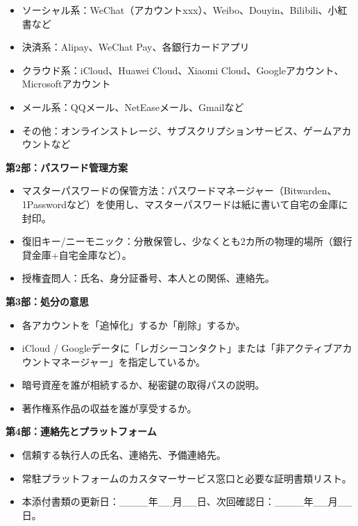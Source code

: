 \begin{itemize}
  \item ソーシャル系：WeChat（アカウントxxx）、Weibo、Douyin、Bilibili、小紅書など
  \item 決済系：Alipay、WeChat Pay、各銀行カードアプリ
  \item クラウド系：iCloud、Huawei Cloud、Xiaomi Cloud、Googleアカウント、Microsoftアカウント
  \item メール系：QQメール、NetEaseメール、Gmailなど
  \item その他：オンラインストレージ、サブスクリプションサービス、ゲームアカウントなど
\end{itemize}

\textbf{第2部：パスワード管理方案}

\begin{itemize}
  \item マスターパスワードの保管方法：パスワードマネージャー（Bitwarden、1Passwordなど）を使用し、マスターパスワードは紙に書いて自宅の金庫に封印。
  \item 復旧キー/ニーモニック：分散保管し、少なくとも2カ所の物理的場所（銀行貸金庫+自宅金庫など）。
  \item 授権査問人：氏名、身分証番号、本人との関係、連絡先。
\end{itemize}

\textbf{第3部：処分の意思}

\begin{itemize}
  \item 各アカウントを「追悼化」するか「削除」するか。
  \item iCloud / Googleデータに「レガシーコンタクト」または「非アクティブアカウントマネージャー」を指定しているか。
  \item 暗号資産を誰が相続するか、秘密鍵の取得パスの説明。
  \item 著作権系作品の収益を誰が享受するか。
\end{itemize}

\textbf{第4部：連絡先とプラットフォーム}

\begin{itemize}
  \item 信頼する執行人の氏名、連絡先、予備連絡先。
  \item 常駐プラットフォームのカスタマーサービス窓口と必要な証明書類リスト。
  \item 本添付書類の更新日：\_\_\_\_年\_\_月\_\_日、次回確認日：\_\_\_\_年\_\_月\_\_日。
\end{itemize}

